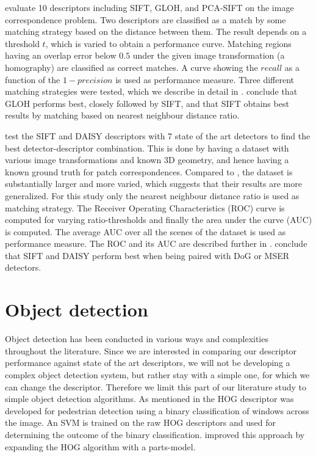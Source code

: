 \documentclass[thesis.tex]{subfiles}
\begin{document}
\citet{mikolajczyk2005performance} evaluate 10 descriptors including SIFT, GLOH, and PCA-SIFT on the image correspondence problem. Two descriptors are classified as a match by some matching strategy based on the distance between them. The result depends on a threshold $t$, which is varied to obtain a performance curve. Matching regions having an overlap error below $0.5$ under the given image transformation (a homography) are classified as correct matches. A curve showing the $recall$ as a function of the $1-precision$ is used as performance measure. Three different matching strategies were tested, which we describe in detail in .  \citet{mikolajczyk2005performance} conclude that GLOH performs best, closely followed by SIFT, and that SIFT obtains best results by matching based on nearest neighbour distance ratio.

\citet{dahl2011finding} test the SIFT and DAISY descriptors with 7 state of the art detectors to find the best detector-descriptor combination. This is done by having a dataset with various image transformations and known 3D geometry, and hence having a known ground truth for patch correspondences. Compared to \citet{mikolajczyk2005performance}, the dataset is substantially larger and more varied, which suggests that their results are more generalized. For this study only the nearest neighbour distance ratio is used as matching strategy. The Receiver Operating Characteristics (ROC) curve is computed for varying ratio-thresholds and finally the area under the curve (AUC) is computed. The average AUC over all the scenes of the dataset is used as performance measure. The ROC and its AUC are described further in . \citet{dahl2011finding} conclude that SIFT and DAISY perform best when being paired with DoG or MSER detectors.
%
\section{Object detection}
%
Object detection has been conducted in various ways and complexities throughout the literature. Since we are interested in comparing our descriptor performance against state of the art descriptors, we will not be developing a complex object detection system, but rather stay with a simple one, for which we can change the descriptor. Therefore we limit this part of our literature study to simple object detection algorithms. As mentioned in  the HOG descriptor \cite{dalal2005histograms} was developed for pedestrian detection using a binary classification of windows across the image. An SVM is trained on the raw HOG descriptors and used for determining the outcome of the binary classification. \citet{felzenszwalb2008discriminatively} improved this approach by expanding the HOG algorithm with a parts-model.
\end{document}

